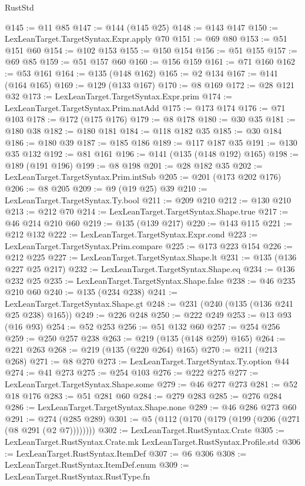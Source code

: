 \begin{lexlean}{RustStd}
\begin{coremodule}
{\begin{coremodule}
{{{{{{{{{{{@145 := @11 @85
@147 := @144 (@145 @25)
@148 := @143 @147
@150 := LexLeanTarget.TargetSyntax.Expr.apply @70
@151 := @69 @80
@153 := @51 @151 @60
@154 := @102 @153
@155 := @150 @154
@156 := @51 @155
@157 := @69 @85
@159 := @51 @157 @60
@160 := @156 @159
@161 := @71 @160
@162 := @53 @161
@164 := @135 (@148 @162)
@165 := @2 @134
@167 := @141 (@164 @165)
@169 := @129 (@133 @167)
@170 := @8 @169
@172 := @28 @121 @32
@173 := LexLeanTarget.TargetSyntax.Expr.prim
@174 := LexLeanTarget.TargetSyntax.Prim.natAdd
@175 := @173 @174
@176 := @71 @103
@178 := @172 (@175 @176)
@179 := @8 @178
@180 := @30 @35
@181 := @180 @38
@182 := @180 @181
@184 := @118 @182 @35
@185 := @30 @184
@186 := @180 @39
@187 := @185 @186
@189 := @117 @187 @35
@191 := @130 @35 @132
@192 := @81 @161
@196 := @141 (@135 (@148 @192) @165)
@198 := @189 (@191 @196)
@199 := @8 @198
@201 := @28 @182 @35
@202 := LexLeanTarget.TargetSyntax.Prim.intSub
@205 := @201 (@173 @202 @176)
@206 := @8 @205
@209 := @9 (@19 @25) @39
@210 := LexLeanTarget.TargetSyntax.Ty.bool
@211 := @209 @210
@212 := @130 @210
@213 := @212 @70
@214 := LexLeanTarget.TargetSyntax.Shape.true
@217 := @46 @214 @210 @60
@219 := @135 (@139 @217)
@220 := @143 @115
@221 := @212 @132
@222 := LexLeanTarget.TargetSyntax.Expr.cond
@223 := LexLeanTarget.TargetSyntax.Prim.compare
@225 := @173 @223 @154
@226 := @212 @225
@227 := LexLeanTarget.TargetSyntax.Shape.lt
@231 := @135 (@136 @227 @25 @217)
@232 := LexLeanTarget.TargetSyntax.Shape.eq
@234 := @136 @232 @25
@235 := LexLeanTarget.TargetSyntax.Shape.false
@238 := @46 @235 @210 @60
@240 := @135 (@234 @238)
@241 := LexLeanTarget.TargetSyntax.Shape.gt
@248 := @231 (@240 (@135 (@136 @241 @25 @238) @165))
@249 := @226 @248
@250 := @222 @249
@253 := @13 @93 (@16 @93)
@254 := @52 @253
@256 := @51 @132 @60
@257 := @254 @256
@259 := @250 @257 @238
@263 := @219 (@135 (@148 @259) @165)
@264 := @221 @263
@268 := @219 (@135 (@220 @264) @165)
@270 := @211 (@213 @268)
@271 := @8 @270
@273 := LexLeanTarget.TargetSyntax.Ty.option @44
@274 := @41 @273
@275 := @254 @103
@276 := @222 @275
@277 := LexLeanTarget.TargetSyntax.Shape.some
@279 := @46 @277 @273
@281 := @52 @18 @176
@283 := @51 @281 @60
@284 := @279 @283
@285 := @276 @284
@286 := LexLeanTarget.TargetSyntax.Shape.none
@289 := @46 @286 @273 @60
@291 := @274 (@285 @289)
@301 := @5 (@112 (@170 (@179 (@199 (@206 (@271 (@8 @291 (@2 @7))))))))
@302 := LexLeanTarget.RustSyntax.Crate
@305 := LexLeanTarget.RustSyntax.Crate.mk LexLeanTarget.RustSyntax.Profile.std
@306 := LexLeanTarget.RustSyntax.ItemDef
@307 := @6 @306
@308 := LexLeanTarget.RustSyntax.ItemDef.enum
@309 := LexLeanTarget.RustSyntax.RustType.fn
}}}}}}}}}}}
\end{coremodule}}
\end{coremodule}
\end{lexlean}
